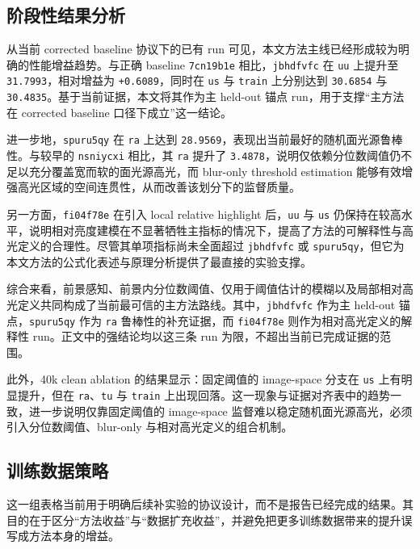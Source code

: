 \documentclass[UTF8,a4paper]{ctexart}
\begin{document}
\subsection{阶段性结果分析}

从当前 corrected baseline 协议下的已有 run 可见，本文方法主线已经形成较为明确的性能增益趋势。与正确 baseline \texttt{7cn19b1e} 相比，\texttt{jbhdfvfc} 在 \texttt{uu} 上提升至 \texttt{31.7993}，相对增益为 \texttt{+0.6089}，同时在 \texttt{us} 与 \texttt{train} 上分别达到 \texttt{30.6854} 与 \texttt{30.4835}。基于当前证据，本文将其作为主 held-out 锚点 run，用于支撑“主方法在 corrected baseline 口径下成立”这一结论。

进一步地，\texttt{spuru5qy} 在 \texttt{ra} 上达到 \texttt{28.9569}，表现出当前最好的随机面光源鲁棒性。与较早的 \texttt{nsniycxi} 相比，其 \texttt{ra} 提升了 \texttt{3.4878}，说明仅依赖分位数阈值仍不足以充分覆盖宽而软的面光源高光，而 blur-only threshold estimation 能够有效增强高光区域的空间连贯性，从而改善该划分下的监督质量。

另一方面，\texttt{fi04f78e} 在引入 local relative highlight 后，\texttt{uu} 与 \texttt{us} 仍保持在较高水平，说明相对亮度建模在不显著牺牲主指标的情况下，提高了方法的可解释性与高光定义的合理性。尽管其单项指标尚未全面超过 \texttt{jbhdfvfc} 或 \texttt{spuru5qy}，但它为本文方法的公式化表述与原理分析提供了最直接的实验支撑。

综合来看，前景感知、前景内分位数阈值、仅用于阈值估计的模糊以及局部相对高光定义共同构成了当前最可信的主方法路线。其中，\texttt{jbhdfvfc} 作为主 held-out 锚点，\texttt{spuru5qy} 作为 \texttt{ra} 鲁棒性的补充证据，而 \texttt{fi04f78e} 则作为相对高光定义的解释性 run。正文中的强结论均以这三条 run 为限，不超出当前已完成证据的范围。

此外，40k clean ablation 的结果显示：固定阈值的 image-space 分支在 \texttt{us} 上有明显提升，但在 \texttt{ra}、\texttt{tu} 与 \texttt{train} 上出现回落。这一现象与证据对齐表中的趋势一致，进一步说明仅靠固定阈值的 image-space 监督难以稳定随机面光源高光，必须引入分位数阈值、blur-only 与相对高光定义的组合机制。

\subsection{训练数据策略}

这一组表格当前用于明确后续补实验的协议设计，而不是报告已经完成的结果。其目的在于区分“方法收益”与“数据扩充收益”，并避免把更多训练数据带来的提升误写成方法本身的增益。
\end{document}
